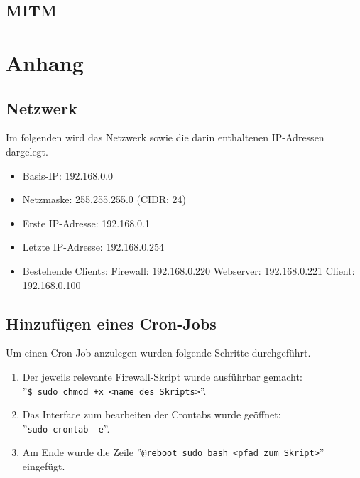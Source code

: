 \documentclass[
    a4paper,
    pagesize,
	pdftex,
    12pt,
]{scrartcl}
\begin{document}
\subsection{MITM}

\newpage
\section{Anhang}

\subsection{Netzwerk}
Im folgenden wird das Netzwerk sowie die darin enthaltenen IP-Adressen dargelegt.
\begin{itemize}
	\item Basis-IP: 192.168.0.0
	\item Netzmaske: 255.255.255.0 (CIDR: 24)
	\item Erste IP-Adresse: 192.168.0.1
	\item Letzte IP-Adresse: 192.168.0.254
	\item Bestehende Clients:
		\subitem Firewall: 192.168.0.220
		\subitem Webserver: 192.168.0.221
		\subitem Client: 192.168.0.100
\end{itemize}

\subsection{Hinzufügen eines Cron-Jobs}\label{cron-job}
Um einen Cron-Job anzulegen wurden folgende Schritte durchgeführt.
\begin{enumerate}
	\item Der jeweils relevante Firewall-Skript wurde ausführbar gemacht: \\ ''\lstinline[breaklines]|$ sudo chmod +x <name des Skripts>|''.
	\item Das Interface zum bearbeiten der Crontabs wurde geöffnet: \\ ''\lstinline[breaklines]|sudo crontab -e|''.
	\item Am Ende wurde die Zeile ''\lstinline[breaklines]|@reboot sudo bash <pfad zum Skript>|'' eingefügt.
\end{enumerate}
\end{document}
